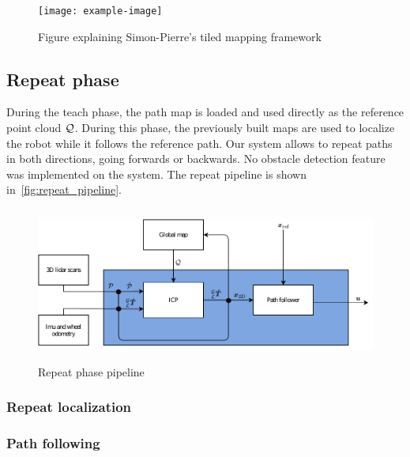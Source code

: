 \begin{figure} [htpb]
	\centering
	\texttt{[image: example-image]}
	\caption{Figure explaining Simon-Pierre's tiled mapping framework}
	\label{fig:tiled_map}
\end{figure}

\subsection{Repeat phase}
\label{sec:repeat_phase}

During the teach phase, the path map is loaded and used directly as the reference point cloud $\mathcal{Q}$.
During this phase, the previously built maps are used to localize the robot while it follows the reference path.
Our system allows to repeat paths in both directions, going forwards or backwards. 
No obstacle detection feature was implemented on the system.
The repeat pipeline is shown in~\autoref{fig:repeat_pipeline}.

\begin{figure} [htpb]
	\centering
	\includegraphics[height=2.0in]{figs/repeat_pipeline.pdf}
	\caption{Repeat phase pipeline}
	\label{fig:repeat_pipeline}
\end{figure}

\subsubsection{Repeat localization}
\label{sec:rep_loc}

\lightlipsum[1]

\subsubsection{Path following}
\label{sec:orthexp}


